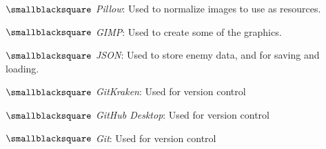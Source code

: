 \documentclass[10mm,letterpaper,notitlepage]{article}
\begin{document}
{{								$\smallblacksquare$ \textit{Pillow}: Used to normalize images to use as resources.
								
								$\smallblacksquare$ \textit{GIMP}: Used to create some of the graphics.
								
								$\smallblacksquare$ \textit{JSON}: Used to store enemy data, and for saving and loading.
								
								$\smallblacksquare$ \textit{GitKraken}: Used for version control
								
								$\smallblacksquare$ \textit{GitHub Desktop}: Used for version control
								
								$\smallblacksquare$ \textit{Git}: Used for version control
								
								\setlength{\parindent}{\parindent-4mm}
							\par}
					\setlength{\parindent}{\parindent-4mm}
				\setlength{\parindent}{\parindent-4mm}
			\par}
\end{document}
